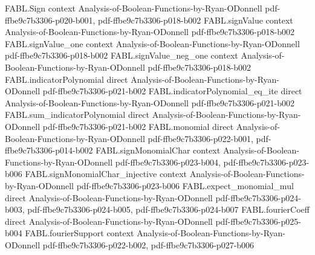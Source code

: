 \begin{theorem}
\label{FABL.arrowsTheorem}
\leanok
{}
\proofstep
  {FABL.Sign}
  {context}
  {Analysis-of-Boolean-Functions-by-Ryan-ODonnell}
  {pdf-ffbe9c7b3306-p020-b001,
    pdf-ffbe9c7b3306-p018-b002}
\proofstep
  {FABL.signValue}
  {context}
  {Analysis-of-Boolean-Functions-by-Ryan-ODonnell}
  {pdf-ffbe9c7b3306-p018-b002}
\proofstep
  {FABL.signValue_one}
  {context}
  {Analysis-of-Boolean-Functions-by-Ryan-ODonnell}
  {pdf-ffbe9c7b3306-p018-b002}
\proofstep
  {FABL.signValue_neg_one}
  {context}
  {Analysis-of-Boolean-Functions-by-Ryan-ODonnell}
  {pdf-ffbe9c7b3306-p018-b002}
\proofstep
  {FABL.indicatorPolynomial}
  {direct}
  {Analysis-of-Boolean-Functions-by-Ryan-ODonnell}
  {pdf-ffbe9c7b3306-p021-b002}
\proofstep
  {FABL.indicatorPolynomial_eq_ite}
  {direct}
  {Analysis-of-Boolean-Functions-by-Ryan-ODonnell}
  {pdf-ffbe9c7b3306-p021-b002}
\proofstep
  {FABL.sum_indicatorPolynomial}
  {direct}
  {Analysis-of-Boolean-Functions-by-Ryan-ODonnell}
  {pdf-ffbe9c7b3306-p021-b002}
\proofstep
  {FABL.monomial}
  {direct}
  {Analysis-of-Boolean-Functions-by-Ryan-ODonnell}
  {pdf-ffbe9c7b3306-p022-b001,
    pdf-ffbe9c7b3306-p014-b002}
\proofstep
  {FABL.signMonomialChar}
  {context}
  {Analysis-of-Boolean-Functions-by-Ryan-ODonnell}
  {pdf-ffbe9c7b3306-p023-b004,
    pdf-ffbe9c7b3306-p023-b006}
\proofstep
  {FABL.signMonomialChar_injective}
  {context}
  {Analysis-of-Boolean-Functions-by-Ryan-ODonnell}
  {pdf-ffbe9c7b3306-p023-b006}
\proofstep
  {FABL.expect_monomial_mul}
  {direct}
  {Analysis-of-Boolean-Functions-by-Ryan-ODonnell}
  {pdf-ffbe9c7b3306-p024-b003,
    pdf-ffbe9c7b3306-p024-b005,
    pdf-ffbe9c7b3306-p024-b007}
\proofstep
  {FABL.fourierCoeff}
  {direct}
  {Analysis-of-Boolean-Functions-by-Ryan-ODonnell}
  {pdf-ffbe9c7b3306-p025-b004}
\proofstep
  {FABL.fourierSupport}
  {context}
  {Analysis-of-Boolean-Functions-by-Ryan-ODonnell}
  {pdf-ffbe9c7b3306-p022-b002,
    pdf-ffbe9c7b3306-p027-b006}

\end{theorem}
